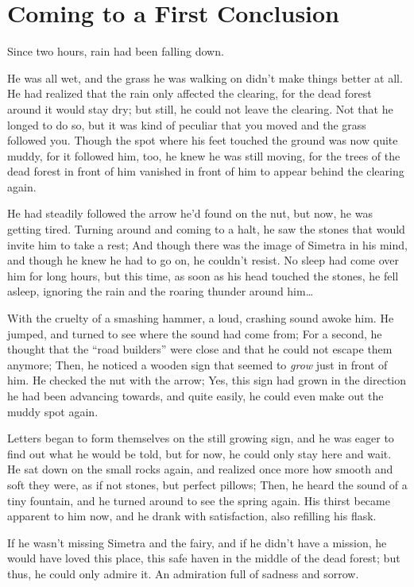 \chapter{Coming to a First Conclusion}
\label{cha:coming-first-concl}
Since two hours, rain had been falling down.

He was all wet, and the grass he was walking on didn't make things better at all. He had realized that the rain only affected the clearing, for the dead forest around it would stay dry; but still, he could not leave the clearing. Not that he longed to do so, but it was kind of peculiar that you moved and the grass followed you. Though the spot where his feet touched the ground was now quite muddy, for it followed him, too, he knew he was still moving, for the trees of the dead forest in front of him vanished in front of him to appear behind the clearing again.

He had steadily followed the arrow he'd found on the nut, but now, he was getting tired. Turning around and coming to a halt, he saw the stones that would invite him to take a rest; And though there was the image of Simetra in his mind, and though he knew he had to go on, he couldn't resist. No sleep had come over him for long hours, but this time, as soon as his head touched the stones, he fell asleep, ignoring the rain and the roaring thunder around him\dots{}

With the cruelty of a smashing hammer, a loud, crashing sound awoke him. 
He jumped, and turned to see where the sound had come from; For a second, he thought that the \enquote{road builders} were close and that he could not escape them anymore;
Then, he noticed a wooden sign that seemed to \emph{grow} just in front of him.
He checked the nut with the arrow; Yes, this sign had grown in the direction he had been advancing towards, and quite easily, he could even make out the muddy spot again.

Letters began to form themselves on the still growing sign, and he was eager to find out what he would be told, but for now, he could only stay here and wait. 
He sat down on the small rocks again, and realized once more how smooth and soft they were, as if not stones, but perfect pillows; Then, he heard the sound of a tiny fountain, and he turned around to see the spring again. His thirst became apparent to him now, and he drank with satisfaction, also refilling his flask.

If he wasn't missing Simetra and the fairy, and if he didn't have a mission, he would have loved this place, this safe haven in the middle of the dead forest; but thus, he could only admire it. 
An admiration full of sadness and sorrow.

